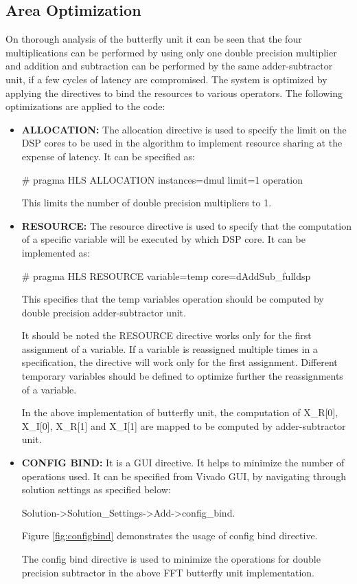 \subsection{Area Optimization}\label{4.3.1}
On thorough analysis of the butterfly unit it can be seen that the four multiplications can be performed by using only one double precision multiplier and addition and subtraction can be performed by the same adder-subtractor unit, if a few cycles of latency are compromised. The system is optimized by applying the directives to bind the resources to various operators. The following optimizations are applied to the code:
\begin{itemize}
\item
\textbf{ALLOCATION:} The allocation directive is used to specify the limit on the DSP cores to be used in the algorithm to implement resource sharing at the expense of latency. It can be specified as:

\# pragma HLS ALLOCATION instances=dmul limit=1 operation

\noindent This limits the number of double precision multipliers to 1.
\item
\textbf{RESOURCE:} The resource directive is used to specify that the computation of a specific variable will be executed by which DSP core. It can be implemented as:

\# pragma HLS RESOURCE variable=temp core=dAddSub\_fulldsp

\noindent This specifies that the temp variables operation should be computed by double precision adder-subtractor unit.

\noindent It should be noted the RESOURCE directive works only for the first assignment of a variable. If a variable is reassigned multiple times in a specification, the directive will work only for the first assignment. Different temporary variables should be defined to optimize further the reassignments of a variable.

In the above implementation of butterfly unit, the computation of X\_R[0], X\_I[0], X\_R[1] and X\_I[1] are mapped to be computed by adder-subtractor unit.
\item
\textbf{CONFIG BIND:} It is a GUI directive. It helps to minimize the number of operations used. It can be specified from Vivado GUI, by navigating through solution settings as specified below:

Solution-\textgreater Solution\_Settings-\textgreater Add-\textgreater config\_bind.

Figure \ref{fig:configbind} demonstrates the usage of config bind directive.



The config bind directive is used to minimize the operations for double precision subtractor in the above FFT butterfly unit implementation.
\end{itemize}
